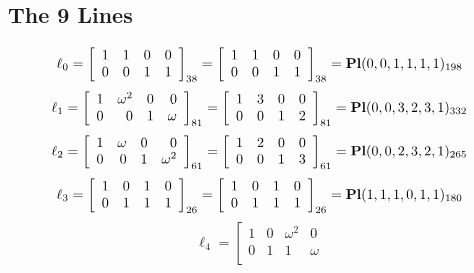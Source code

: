 \documentclass{article}
\begin{document}
{\subsection*{The 9 Lines}
$$
\ell_{0} = 
\left[
\begin{array}{*{4}{r}}
1 & 1 & 0 & 0\\
0 & 0 & 1 & 1\\
\end{array}
\right]
_{38}
=
\left[
\begin{array}{*{4}c}
1  & 1  & 0  & 0\\
0  & 0  & 1  & 1\\
\end{array}
\right]_{38}
={\rm\bf Pl}(0,0,1,1,1,1 )_{198}$$
$$
\ell_{1} = 
\left[
\begin{array}{*{4}{r}}
1 & \omega^{2} & 0 & 0\\
0 & 0 & 1 & \omega \\
\end{array}
\right]
_{81}
=
\left[
\begin{array}{*{4}c}
1  & 3  & 0  & 0\\
0  & 0  & 1  & 2\\
\end{array}
\right]_{81}
={\rm\bf Pl}(0,0,3,2,3,1 )_{332}$$
$$
\ell_{2} = 
\left[
\begin{array}{*{4}{r}}
1 & \omega  & 0 & 0\\
0 & 0 & 1 & \omega^{2}\\
\end{array}
\right]
_{61}
=
\left[
\begin{array}{*{4}c}
1  & 2  & 0  & 0\\
0  & 0  & 1  & 3\\
\end{array}
\right]_{61}
={\rm\bf Pl}(0,0,2,3,2,1 )_{265}$$
$$
\ell_{3} = 
\left[
\begin{array}{*{4}{r}}
1 & 0 & 1 & 0\\
0 & 1 & 1 & 1\\
\end{array}
\right]
_{26}
=
\left[
\begin{array}{*{4}c}
1  & 0  & 1  & 0\\
0  & 1  & 1  & 1\\
\end{array}
\right]_{26}
={\rm\bf Pl}(1,1,1,0,1,1 )_{180}$$
$$
\ell_{4} = 
\left[
\begin{array}{*{4}{r}}
1 & 0 & \omega^{2} & 0\\
0 & 1 & 1 & \omega \\

\end{array}$$}
\end{document}
